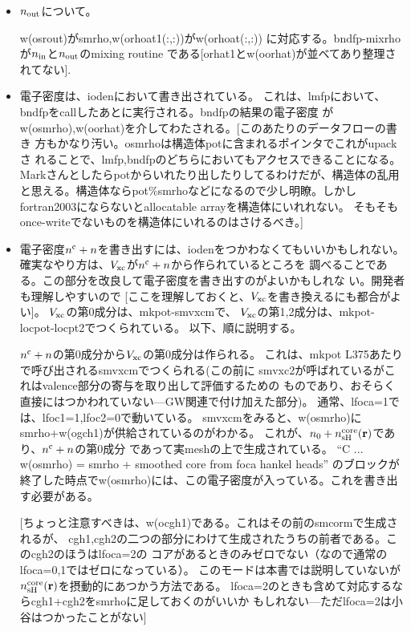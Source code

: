 \documentclass[twocolumn,showpacs,preprintnumbers,amsmath,amssymb,floatfix]{revtex4-1}
\newcommand{\bfr}{{\bf r}}
\begin{document}
\begin{widetext}
\begin{itemize}
\item
$n_{\rm out}$について。

w(osrout)がsmrho,w(orhoat1(:,:))がw(orhoat(:,:))
に対応する。bndfp-mixrhoが$n_{\rm in}$と$n_{\rm out}$のmixing routine
である[orhat1とw(oorhat)が並べてあり整理されてない].

\item
電子密度は、iodenにおいて書き出されている。
これは、lmfpにおいて、bndfpをcallしたあとに実行される。bndfpの結果の電子密度
がw(osmrho),w(oorhat)を介してわたされる。{\small[このあたりのデータフローの書き
     方もかなり汚い。osmrhoは構造体potに含まれるポインタでこれがupackさ
     れることで、lmfp,bndfpのどちらにおいてもアクセスできることになる。
     Markさんとしたらpotからいれたり出したりしてるわけだが、構造体の乱用
     と思える。構造体ならpot\%smrhoなどになるので少し明瞭。しかし
     fortran2003にならないとallocatable arrayを構造体にいれれない。
     そもそもonce-writeでないものを構造体にいれるのはさけるべき。]}


\item
電子密度$n^{\rm c}+n$を書き出すには、iodenをつかわなくてもいいかもしれない。
確実なやり方は、$V_{\rm xc}$が$n^{\rm c}+n$から作られているところを
調べることである。この部分を改良して電子密度を書き出すのがよいかもしれな
い。開発者も理解しやすいので
[ここを理解しておくと、$V_{\rm xc}$を書き換えるにも都合がよい]。
$V_{\rm xc}$の第0成分は、mkpot-smvxcmで、
$V_{\rm xc}$の第1,2成分は、mkpot-locpot-locpt2でつくられている。
以下、順に説明する。

$n^{\rm c}+n$の第0成分から$V_{\rm xc}$の第0成分は作られる。
これは、mkpot L375あたりで呼び出されるsmvxcmでつくられる(この前に
smvxc2が呼ばれているがこれはvalence部分の寄与を取り出して評価するための
ものであり、おそらく直接にはつかわれていない---GW関連で付け加えた部分)。
通常、lfoca=1では、lfoc1=1,lfoc2=0で動いている。
smvxcmをみると、w(osmrho)にsmrho+w(ogch1)が供給されているのがわかる。
これが、$n_0+n^{\rm core}_{\rm sH}(\bfr)$であり、$n^{\rm c}+n$の第0成分
であって実meshの上で生成されている。
``C ... w(osmrho) = smrho + smoothed core from foca hankel heads''
のブロックが終了した時点でw(osmrho)には、この電子密度が入っている。これを書き出す必要がある。

{\small [ちょっと注意すべきは、w(ocgh1)である。これはその前のsmcormで生成されるが、
cgh1,cgh2の二つの部分にわけて生成されたうちの前者である。このcgh2のほうはlfoca=2の
コアがあるときのみゼロでない（なので通常のlfoca=0,1ではゼロになっている）。
このモードは本書では説明していないが
$n^{\rm core}_{\rm sH}(\bfr)$を摂動的にあつかう方法である。
lfoca=2のときも含めて対応するならcgh1+cgh2をsmrhoに足しておくのがいいか
もしれない---ただlfoca=2は小谷はつかったことがない]}


\end{itemize}
\end{widetext}
\end{document}
